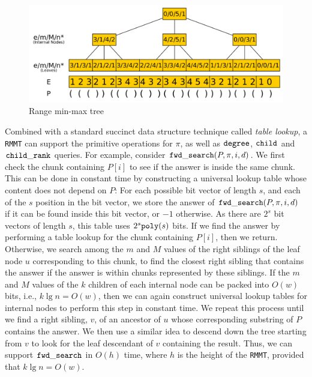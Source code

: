 \begin{figure}[t]
  \centering
  \includegraphics[scale=0.18]{./images/Range-min-max-tree.png}
  \caption{Range min-max tree}
  \label{fig:RangeMinMaxTree}
\end{figure}

Combined with a standard succinct data structure technique called {\em table
  lookup}, a {\tt RMMT} can support the primitive operations for $\pi$, as well
as $\mathtt{degree}$, $\mathtt{child}$ and $\mathtt{child\_rank}$ queries.
For example, consider $\mathtt{fwd\_search}(P,\pi,i,d)$.
We first check the chunk containing $P[i]$ to see if the answer is inside the
same chunk.
This can be done in constant time by constructing a universal lookup table whose
content does not depend on $P$: For each possible bit vector of length $s$,
and each of the $s$ position in the bit vector, we store the answer of
$\mathtt{fwd\_search}(P,\pi,i,d)$ if it can be found inside this bit vector, or $-1$
otherwise.
As there are $2^s$ bit vectors of length $s$, this table uses
$2^s\mathtt{poly}(s)$ bits.
If we find the  answer by performing a table lookup for the chunk containing
$P[i]$, then we return.
Otherwise, we search among the $m$ and $M$ values of the right siblings of the
leaf node $u$ corresponding to this chunk, to find the closest right sibling
that contains the answer if the answer is within chunks represented by these
siblings.
If the $m$ and $M$ values of the $k$ children of each internal node can be
packed into $O(w)$ bits, i.e., $k \lg n = O(w)$, then we can again construct
universal lookup tables for internal nodes to perform this step in constant
time.
We repeat this process until we find a right sibling, $v$, of an ancestor of $u$
whose corresponding substring of $P$ contains the answer.
We then use a similar idea to descend down the tree starting from $v$ to look
for the leaf descendant of $v$ containing the result.
Thus, we can support $\mathtt{fwd\_search}$ in $O(h)$ time, where $h$ is the height of the
{\tt RMMT}, provided that $k \lg n = O(w)$.

